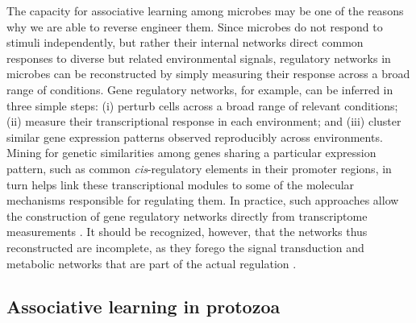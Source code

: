 The capacity for associative learning among microbes may be one of the reasons why we are able to reverse engineer them. Since microbes do not respond to stimuli independently, but rather their internal networks direct common responses to diverse but related environmental signals, regulatory networks in microbes can be reconstructed by simply measuring their response across a broad range of conditions. Gene regulatory networks, for example, can be inferred in three simple steps: (i) perturb cells across a broad range of relevant conditions; (ii) measure their transcriptional response in each environment; and (iii) cluster similar gene expression patterns observed reproducibly across environments. Mining for genetic similarities among genes sharing a particular expression pattern, such as common \textit{cis}-regulatory elements in their promoter regions, in turn helps link these transcriptional modules to some of the molecular mechanisms responsible for regulating them. In practice, such approaches allow the construction of gene regulatory networks directly from transcriptome measurements \cite{reiss_integrated_2006}. It should be recognized, however, that the networks thus reconstructed are incomplete, as they forego the signal transduction and metabolic networks that are part of the actual regulation \cite{ter_kuile_transcriptome_2001}.

\subsection{Associative learning in protozoa}

